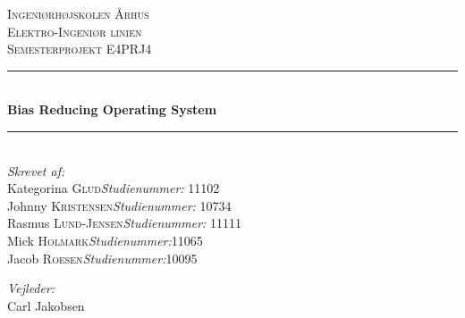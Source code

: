 \newcommand{\HRule}{\rule{\linewidth}{0.5mm}} %

\begin{center} %
 

\textsc{\LARGE Ingeniørhøjskolen Århus}\\[1.5cm] %
\textsc{\Large Elektro-Ingeniør linien}\\[0.5cm] %
\textsc{\large Semesterprojekt E4PRJ4}\\[0.5cm] %


\HRule \\[0.4cm]
{ \huge \bfseries Bias Reducing Operating System}\\[0.4cm] %
\HRule \\[1.5cm]
 

\Large \emph{Skrevet af:}\\
Kategorina \textsc{Glud}\hfill \textit{Studienummer:} 11102\\
Johnny \textsc{Kristensen}\hfill \textit{Studienummer:} 10734\\
Rasmus \textsc{Lund-Jensen}\hfill \textit{Studienummer:} 11111\\
Mick \textsc{Holmark}\hfill \textit{Studienummer:}11065\\
Jacob \textsc{Roesen}\hfill \textit{Studienummer:}10095\\
 

\vfill %

\Large \emph{Vejleder:}\hfill\phantom{m}\\
Carl Jakobsen\hfill \phantom{m}


\end{center}
